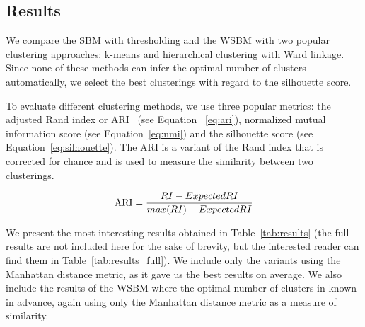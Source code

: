\documentclass[conference]{IEEEtran}
\begin{document}
\subsection{Results}

We compare the SBM with thresholding and the WSBM with two popular clustering approaches: k-means and hierarchical clustering with Ward linkage. Since none of these methods can infer the optimal number of clusters automatically, we select the best clusterings with regard to the silhouette score.

To evaluate different clustering methods, we use three popular metrics: the adjusted Rand index or ARI~\cite{hubert1985comparing} (see Equation ~\ref{eq:ari}), normalized mutual information score (see Equation~\ref{eq:nmi}) and the silhouette score (see Equation~\ref{eq:silhouette}). The ARI is a variant of the Rand index that is corrected for chance and is used to measure the similarity between two clusterings.

\begin{equation}\label{eq:ari}
\textnormal{ARI} = \frac{RI - ExpectedRI}{max(RI) - ExpectedRI}
\end{equation}

We present the most interesting results obtained in Table~\ref{tab:results} (the full results are not included here for the sake of brevity, but the interested reader can find them in Table~\ref{tab:results_full}). We include only the variants using the Manhattan distance metric, as it gave us the best results on average. We also include the results of the WSBM where the optimal number of clusters in known in advance, again using only the Manhattan distance metric as a measure of similarity.
\end{document}
